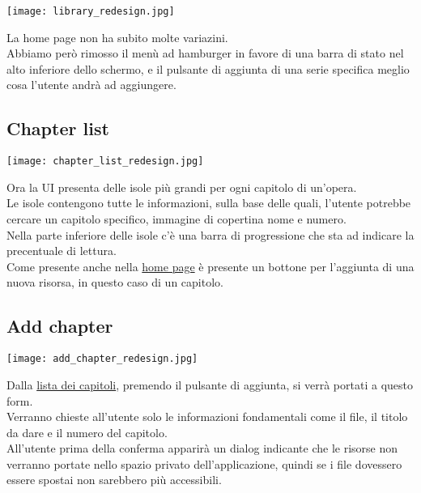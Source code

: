 \documentclass[../Assignment-3-LPSMT.tex]{subfiles}
\begin{document}
\begin{center}
   \texttt{[image: library\_redesign.jpg]}
\end{center}

La home page non ha subito molte variazini.\\
Abbiamo però rimosso il menù ad hamburger in favore di una barra di stato nel alto inferiore dello schermo, e il pulsante di aggiunta di una serie specifica meglio cosa l'utente andrà ad aggiungere.

\subsection{Chapter list}\label{sec:ch_list_redesign}

\begin{center}
   \texttt{[image: chapter\_list\_redesign.jpg]}
\end{center}

Ora la UI presenta delle isole più grandi per ogni capitolo di un'opera.\\
Le isole contengono tutte le informazioni, sulla base delle quali, l'utente potrebbe cercare un capitolo specifico, immagine di copertina nome e numero.\\
Nella parte inferiore delle isole c'è una barra di progressione che sta ad indicare la precentuale di lettura.\\
Come presente anche nella \hyperref[sec:home_redesign]{home page} è presente un bottone per l'aggiunta di una nuova risorsa, in questo caso di un capitolo.

\subsection{Add chapter}

\begin{center}
   \texttt{[image: add\_chapter\_redesign.jpg]}
\end{center}

Dalla \hyperref[sec:ch_list_redesign]{lista dei capitoli}, premendo il pulsante di aggiunta, si verrà portati a questo form.\\
Verranno chieste all'utente solo le informazioni fondamentali come il file, il titolo da dare e il numero del capitolo.\\
All'utente prima della conferma apparirà un dialog indicante che le risorse non verranno portate nello spazio privato dell'applicazione, quindi se i file dovessero essere spostai non sarebbero più accessibili.
\end{document}
